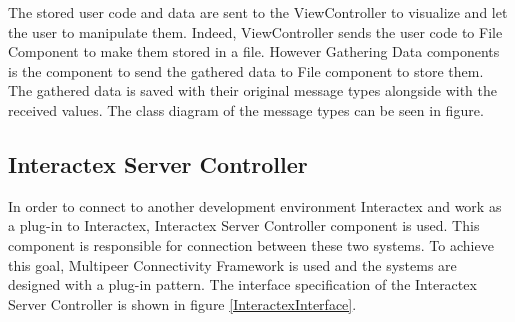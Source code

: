 The stored user code and data are sent to the ViewController to visualize and let the user to manipulate them. Indeed, ViewController sends the user code to File Component to make them stored in a file. However Gathering Data components is the component to send the gathered data to File component to store them. The gathered data is saved with their original message types alongside with the received values. The class diagram of the message types can be seen in figure.


\subsection{Interactex Server Controller}
In order to connect to another development environment Interactex and work as a plug-in to Interactex, Interactex Server Controller component is used. This component is responsible for connection between these two systems. To achieve this goal, Multipeer Connectivity Framework is used and the systems are designed with a plug-in pattern. The interface specification of the Interactex Server Controller is shown in figure \ref{InteractexInterface}.\\

